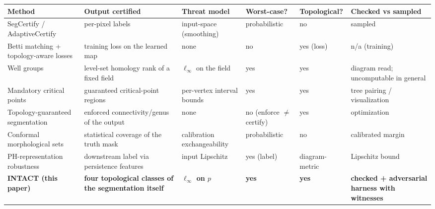 \documentclass[10pt]{article}
\begin{document}
\begin{center}
\small
\setlength{\tabcolsep}{4pt}
\begin{tabular}{L{2.9cm}L{2.7cm}L{2.1cm}L{1.9cm}L{2.05cm}L{2.1cm}}
\toprule
\textbf{Method} & \textbf{Output certified} & \textbf{Threat model} &
\textbf{Worst-case?} & \textbf{Topological?} & \textbf{Checked vs sampled} \\
\midrule
SegCertify \citep{fischer2021segcert} / AdaptiveCertify \citep{anani2024adaptive} &
per-pixel labels & input-space (smoothing) & probabilistic & no & sampled \\
Betti matching \citep{stucki2023betti} + topology-aware losses &
training loss on the learned map & none & no & yes (loss) & n/a (training) \\
Well groups \citep{emp2011wellgroups,bendich2013levelsets} &
level-set homology rank of a fixed field & $\ell_\infty$ on the field &
yes & yes & diagram read; uncomputable in general \citep{franek2015wellgroups} \\
Mandatory critical points \citep{gunther2014mandatory} &
guaranteed critical-point regions & per-vertex interval bounds & yes &
yes & tree pairing / visualization \\
Topology-guaranteed segmentation \citep{topoguarantee2026} &
enforced connectivity/genus of the output & none & no (enforce $\ne$
certify) & yes & optimization \\
Conformal morphological sets \citep{mossina2025conformal} &
statistical coverage of the truth mask & calibration exchangeability &
probabilistic & no & calibrated margin \\
PH-representation robustness \citep{agerberg2025certifying} &
downstream label via persistence features & input Lipschitz & yes
(label) & diagram-metric & Lipschitz bound \\
\midrule
\textbf{INTACT (this paper)} & \textbf{four topological classes of the
segmentation itself} & \textbf{$\ell_\infty$ on $p$} & \textbf{yes} &
\textbf{yes} & \textbf{checked + adversarial harness with witnesses} \\
\bottomrule
\end{tabular}
\end{center}
\end{document}
